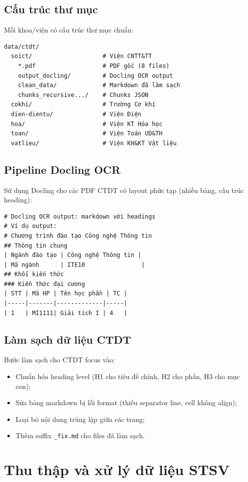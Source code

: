 \documentclass[../DoAn.tex]{subfiles}
\begin{document}
\subsection{Cấu trúc thư mục}
Mỗi khoa/viện có cấu trúc thư mục chuẩn:
\begin{verbatim}
data/ctdt/
  soict/                    # Viện CNTT&TT
    *.pdf                   # PDF gốc (8 files)
    output_docling/         # Docling OCR output
    clean_data/             # Markdown đã làm sạch
    chunks_recursive.../    # Chunks JSON
  cokhi/                    # Trường Cơ khí
  dien-dientu/              # Viện Điện  
  hoa/                      # Viện KT Hóa học
  toan/                     # Viện Toán UD&TH
  vatlieu/                  # Viện KH&KT Vật liệu
\end{verbatim}

\subsection{Pipeline Docling OCR}
Sử dụng Docling cho các PDF CTDT có layout phức tạp (nhiều bảng, cấu trúc heading):
\begin{verbatim}
# Docling OCR output: markdown với headings
# Ví dụ output:
# Chương trình đào tạo Công nghệ Thông tin
## Thông tin chung
| Ngành đào tạo | Công nghệ Thông tin |
| Mã ngành      | ITE10                |
## Khối kiến thức
### Kiến thức đại cương
| STT | Mã HP | Tên học phần | TC |
|-----|-------|-------------|-----|
| 1   | MI1111| Giải tích I | 4   |
\end{verbatim}

\subsection{Làm sạch dữ liệu CTDT}
Bước làm sạch cho CTDT focus vào:
\begin{itemize}
    \item Chuẩn hóa heading level (H1 cho tiêu đề chính, H2 cho phần, H3 cho mục con);
    \item Sửa bảng markdown bị lỗi format (thiếu separator line, cell không align);
    \item Loại bỏ nội dung trùng lặp giữa các trang;
    \item Thêm suffix \texttt{\_fix.md} cho files đã làm sạch.
\end{itemize}

\section{Thu thập và xử lý dữ liệu STSV}
\end{document}
